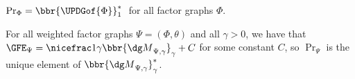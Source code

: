 \begin{frame}
	\begin{theorem}
		$\Pr_{\Phi} = \bbr{\UPDGof{\Phi}}_{1}^*\;$ for all factor graphs $\Phi$.
	\end{theorem}
	\pause
	{
	\begin{theorem}
	For all weighted factor graphs $\Psi = (\Phi,\theta)$ and all $\gamma > 0$,
	we have that
	$\GFE_\Psi
	= \nicefrac1{\gamma} \bbr{{\dg M}_{\Psi,\gamma}}_{\gamma}
	+ C$
	for some constant $C$, so
	$\Pr_{\Psi}$ is the unique element of
	$\bbr{{\dg M}_{\Psi,\gamma}}_{\gamma}^*$.
	\end{theorem}
	}
	\end{frame}
